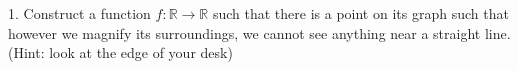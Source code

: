 1. Construct a function $f:\mathbb R\to\mathbb R$ such that there is a point on its graph such that however we magnify its surroundings, we cannot see anything near a straight line. (Hint: look at the edge of your desk)
